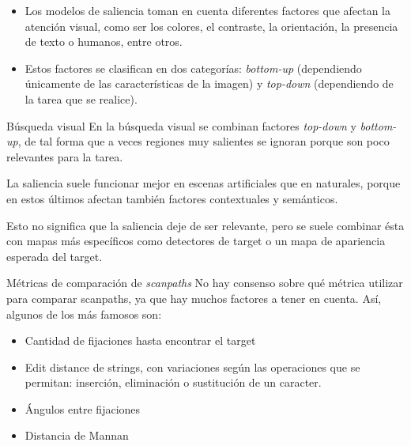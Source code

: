 \documentclass[compress]{beamer}
\begin{document}
\begin{frame}
\begin{itemize}
\item Los modelos de saliencia toman en cuenta diferentes factores que afectan la atención visual, como ser los colores, el contraste, la orientación, la presencia de texto o humanos, entre otros.
\item Estos factores se clasifican en dos categorías: \textit{bottom-up} (dependiendo únicamente de las características de la imagen) y \textit{top-down} (dependiendo de la tarea que se realice).
\end{itemize}
\end{frame}

\begin{frame}{Búsqueda visual}
En la búsqueda visual se combinan factores \textit{top-down} y \textit{bottom-up}, de tal forma que a veces regiones muy salientes se ignoran porque son poco relevantes para la tarea.

\bigskip
La saliencia suele funcionar mejor en escenas artificiales que en naturales, porque en estos últimos afectan también factores contextuales y semánticos.

\bigskip

Esto no significa que la saliencia deje de ser relevante, pero se suele combinar ésta con mapas más específicos como detectores de target o un mapa de apariencia esperada del target.

\end{frame}


\begin{frame}{Métricas de comparación de \textit{scanpaths}}
No hay consenso sobre qué métrica utilizar para comparar scanpaths, ya que hay muchos factores a tener en cuenta. Así, algunos de los más famosos son:
\begin{itemize}
\item Cantidad de fijaciones hasta encontrar el target
\item Edit distance de strings, con variaciones según las operaciones que se permitan: inserción, eliminación o sustitución de un caracter.
\item Ángulos entre fijaciones
\item Distancia de Mannan
\end{itemize}
\end{frame}
\end{document}

